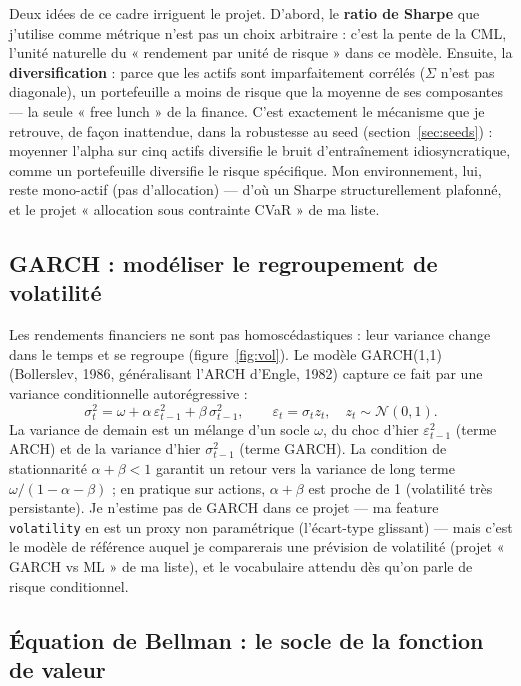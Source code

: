 \documentclass[11pt,a4paper]{article}
\newcommand{\code}[1]{\texttt{#1}}
\begin{document}
Deux idées de ce cadre irriguent le projet. D'abord, le \textbf{ratio de Sharpe} que
j'utilise comme métrique n'est pas un choix arbitraire : c'est la pente de la CML,
l'unité naturelle du « rendement par unité de risque » dans ce modèle. Ensuite, la
\textbf{diversification} : parce que les actifs sont imparfaitement corrélés
($\Sigma$ n'est pas diagonale), un portefeuille a moins de risque que la moyenne de ses
composantes --- la seule « free lunch » de la finance. C'est exactement le mécanisme
que je retrouve, de façon inattendue, dans la robustesse au seed
(section~\ref{sec:seeds}) : moyenner l'alpha sur cinq actifs diversifie le bruit
d'entraînement idiosyncratique, comme un portefeuille diversifie le risque spécifique.
Mon environnement, lui, reste mono-actif (pas d'allocation) --- d'où un Sharpe
structurellement plafonné, et le projet « allocation sous contrainte CVaR » de ma liste.

\subsection{GARCH : modéliser le regroupement de volatilité}
\label{app:garch}

Les rendements financiers ne sont pas homoscédastiques : leur variance change dans le
temps et se regroupe (figure~\ref{fig:vol}). Le modèle GARCH(1,1) (Bollerslev, 1986,
généralisant l'ARCH d'Engle, 1982) capture ce fait par une variance conditionnelle
autorégressive :
\[
\sigma_t^2 = \omega + \alpha\,\varepsilon_{t-1}^2 + \beta\,\sigma_{t-1}^2,
\qquad \varepsilon_t = \sigma_t z_t,\quad z_t \sim \mathcal{N}(0,1) .
\]
La variance de demain est un mélange d'un socle $\omega$, du choc d'hier
$\varepsilon_{t-1}^2$ (terme ARCH) et de la variance d'hier $\sigma_{t-1}^2$ (terme
GARCH). La condition de stationnarité $\alpha + \beta < 1$ garantit un retour vers la
variance de long terme $\omega/(1 - \alpha - \beta)$ ; en pratique sur actions,
$\alpha + \beta$ est proche de 1 (volatilité très persistante). Je n'estime pas de
GARCH dans ce projet --- ma feature \code{volatility} en est un proxy non paramétrique
(l'écart-type glissant) --- mais c'est le modèle de référence auquel je comparerais une
prévision de volatilité (projet « GARCH vs ML » de ma liste), et le vocabulaire attendu
dès qu'on parle de risque conditionnel.

\subsection{Équation de Bellman : le socle de la fonction de valeur}
\label{app:bellman}
\end{document}
